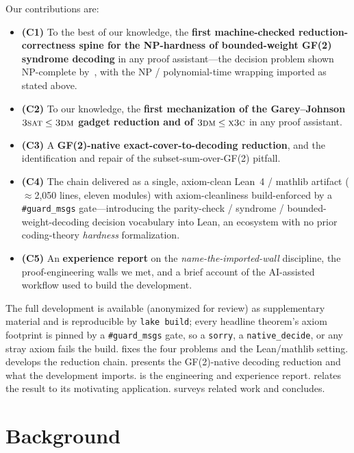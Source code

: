 \documentclass[sigplan,review,anonymous]{acmart}
\begin{document}
Our contributions are:
\begin{itemize}
  \item \textbf{(C1)} To the best of our knowledge, the \textbf{first machine-checked reduction-correctness
    spine for the NP-hardness of bounded-weight GF(2) syndrome decoding} in any proof assistant---the decision
    problem shown NP-complete by~\cite{BMvT78}, with the NP / polynomial-time wrapping imported as stated above.
  \item \textbf{(C2)} To our knowledge, the \textbf{first mechanization of the Garey--Johnson
    $\textsc{3sat} \le \textsc{3dm}$ gadget reduction and of $\textsc{3dm} \le \textsc{x3c}$} in any proof
    assistant.
  \item \textbf{(C3)} A \textbf{GF(2)-native exact-cover-to-decoding reduction}, and the identification and
    repair of the subset-sum-over-GF(2) pitfall.
  \item \textbf{(C4)} The chain delivered as a single, axiom-clean Lean~4 / mathlib artifact
    ($\approx$2{,}050 lines, eleven modules) with axiom-cleanliness build-enforced by a \lstinline{#guard_msgs}
    gate---introducing the parity-check / syndrome / bounded-weight-decoding decision vocabulary into Lean, an
    ecosystem with no prior coding-theory \emph{hardness} formalization.
  \item \textbf{(C5)} An \textbf{experience report} on the \emph{name-the-imported-wall} discipline, the
    proof-engineering walls we met, and a brief account of the AI-assisted workflow used to build the
    development.
\end{itemize}

The full development is available (anonymized for review) as supplementary material and is reproducible by
\lstinline{lake build}; every headline theorem's axiom footprint is pinned by a \lstinline{#guard_msgs} gate, so
a \lstinline{sorry}, a \lstinline{native_decide}, or any stray axiom fails the build.  fixes the
four problems and the Lean/mathlib setting.  develops the reduction chain. 
presents the GF(2)-native decoding reduction and what the development imports.  is the engineering
and experience report.  relates the result to its motivating application. 
surveys related work and  concludes.

\section{Background}\label{sec:bg}
\end{document}
